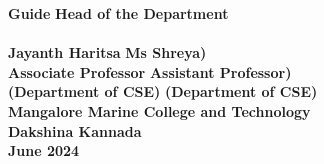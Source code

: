 \documentclass[12pt, a4paper]{report}
\begin{document}
\begin{titlepage}
\begin{center}
			\vspace{0.5in}
			\textbf{Guide} \hspace{3.5in} \textbf{Head of the Department}\\
			\vspace{0.2in}
			\underline{\hspace{6cm}} \hspace{1.5in} \underline{\hspace{6cm}}\\
			\vspace{0.1in} \textbf{Jayanth Haritsa} \hspace{2.7in} \textbf{Ms Shreya)}\\ \vspace{0.1in}
			\textbf{Associate Professor} \hspace{2in} \textbf{Assistant Professor)}\\
			\vspace{0.1in}
			\textbf{(Department of CSE)} \hspace{2.1in} \textbf{(Department of CSE)}\\
			\vspace{0.1in}
			\textbf{Mangalore Marine College and Technology}\\
			\vspace{0.01in}
			\textbf{Dakshina Kannada}\\
			\vspace{0.01in}
			\textbf{June 2024} %
		\end{center}
	\end{titlepage}
	
\end{document}

